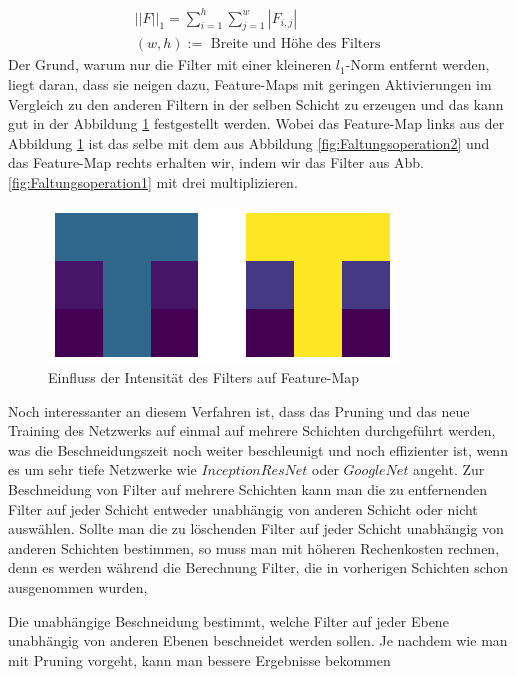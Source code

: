 \documentclass[12pt,a4paper]{scrartcl}
\numberwithin{equation}{section}
\begin{document}
\begin{itemize}
	\begin{equation}\label{eq:l_1}
		\begin{array}{c}		
		{||F||}_1 = \sum_{i =1}^{h}\sum_{j = 1}^{w}{|F_{i,j}|}\\
			(w, h) :=\text{ Breite und Höhe des Filters }
		\end{array}
	\end{equation}
Der Grund, warum nur die Filter mit einer kleineren $ l_1 $-Norm entfernt werden, liegt daran, dass sie neigen dazu, Feature-Maps mit geringen Aktivierungen im Vergleich zu den anderen Filtern in der selben Schicht zu erzeugen und das kann gut in der Abbildung \ref{fig:Filter_Intensität} festgestellt werden. Wobei das Feature-Map links aus der Abbildung \ref{fig:Filter_Intensität} ist das selbe mit dem aus Abbildung \ref{fig:Faltungsoperation2} und das Feature-Map rechts erhalten wir, indem wir das Filter aus Abb. \ref{fig:Faltungsoperation1} mit drei multiplizieren.

	\begin{figure}[h]
		\centering
			
		\includegraphics[scale=.75]{Filter_intensite}
		\caption{Einfluss der Intensität des Filters auf Feature-Map}
		\label{fig:Filter_Intensität}
	\end{figure}
Noch interessanter an diesem Verfahren ist, dass das Pruning und das neue Training des Netzwerks auf einmal auf mehrere Schichten durchgeführt werden, was die Beschneidungszeit noch weiter beschleunigt  und noch effizienter ist, wenn es um sehr tiefe Netzwerke wie $ InceptionResNet $ oder $ GoogleNet $ angeht. Zur Beschneidung von Filter auf mehrere Schichten kann man die zu entfernenden Filter auf jeder Schicht entweder unabhängig von anderen Schicht oder nicht auswählen. Sollte man die zu löschenden Filter auf jeder Schicht unabhängig von anderen Schichten bestimmen, so muss man mit höheren Rechenkosten rechnen, denn es werden während die Berechnung Filter, die in vorherigen Schichten schon ausgenommen wurden, 


 
Die unabhängige Beschneidung bestimmt, welche Filter auf jeder Ebene unabhängig von anderen Ebenen beschneidet werden sollen.
Je nachdem wie man mit Pruning vorgeht, kann man bessere Ergebnisse bekommen



\end{itemize}
\end{document}
